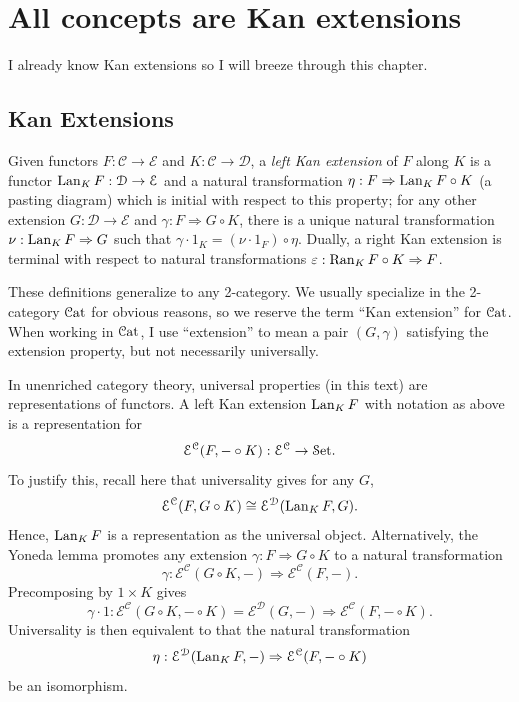 \chapter{All concepts are Kan extensions}

I already know Kan extensions so I will breeze through this chapter.

\section{Kan Extensions}

\begin{definition}\label{dfn:1.1}
	Given functors $F : \mathcal{C}  \to \mathcal{E} $ and $K : \mathcal{C}  \to \mathcal{D} $, a \emph{left Kan extension} of $F$ along $K$ is a functor $\operatorname{Lan}_KF : \mathcal{D}  \to \mathcal{E} $ and a natural transformation $\eta : F \Rightarrow \operatorname{Lan}_KF\circ K$ (a pasting diagram) which is initial with respect to this property; for any other extension $G : \mathcal{D}  \to \mathcal{E} $ and $\gamma : F \Rightarrow G\circ K$, there is a unique natural transformation $\nu : \operatorname{Lan}_KF \Rightarrow G$ such that $\gamma \cdot 1_K = (\nu \cdot  1_F)\circ \eta$. Dually, a right Kan extension is terminal with respect to natural transformations $\varepsilon : \operatorname{Ran}_KF \circ K \Rightarrow F$.
\end{definition}

\begin{remark}
These definitions generalize to any 2-category. We usually specialize in the 2-category $\mathcal{C}\mathrm{at} $ for obvious reasons, so we reserve the term ``Kan extension'' for $\mathcal{C}\mathrm{at} $. When working in $\mathcal{C}\mathrm{at} $, I use ``extension'' to mean a pair $(G,\gamma)$ satisfying the extension property, but not necessarily universally.
\end{remark}

In unenriched category theory, universal properties (in this text) are representations of functors. A left Kan extension $\operatorname{Lan}_KF$ with notation as above is a representation for
\[
	\mathcal{E} ^{\mathcal{C} } (F,-\circ K) : \mathcal{E} ^{\mathcal{C} }  \to \mathcal{S}\mathrm{et} 
.\]
To justify this, recall here that universality gives for any $G$,
\[
	\mathcal{E} ^{\mathcal{C} } (F,G\circ K)\cong \mathcal{E} ^{\mathcal{D} } (\operatorname{Lan}_KF,G)
.\]
Hence, $\operatorname{Lan}_KF$ is a representation as the universal object. Alternatively, the Yoneda lemma promotes any extension $\gamma : F \Rightarrow G\circ K$ to a natural transformation
\[
	\gamma : \mathcal{E} ^{\mathcal{C} } (G\circ K,-) \Rightarrow \mathcal{E} ^{\mathcal{C} } (F,-)
.\]
Precomposing by $1 \times K$ gives
\[
	\gamma \cdot 1 : \mathcal{E} ^{\mathcal{C} } (G\circ K,-\circ K)=\mathcal{E} ^{\mathcal{D} } (G,-) \Rightarrow \mathcal{E} ^{\mathcal{C} } (F,-\circ K)
.\]
Universality is then equivalent to that the natural transformation
\[
	\eta : \mathcal{E} ^{\mathcal{D} } (\operatorname{Lan}_KF,-) \Rightarrow \mathcal{E} ^{\mathcal{C} } (F,-\circ K)
\]
be an isomorphism.

